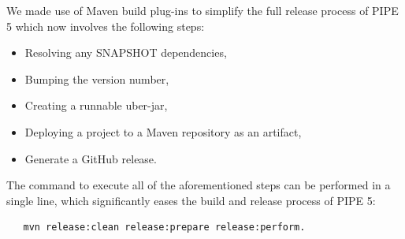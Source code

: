 We made use of Maven build plug-ins to simplify the full release process of PIPE 5 which now involves the following steps:
\begin{itemize} 
    \item Resolving any SNAPSHOT dependencies,
    \item Bumping the version number,
    \item Creating a runnable uber-jar,
    \item Deploying a project to a Maven repository as an artifact,
    \item Generate a GitHub release. 
\end{itemize}
The command to execute all of the aforementioned steps can be performed in a single line, which significantly eases the build and release process of PIPE 5:
\begin{lstlisting}
   mvn release:clean release:prepare release:perform.
\end{lstlisting}